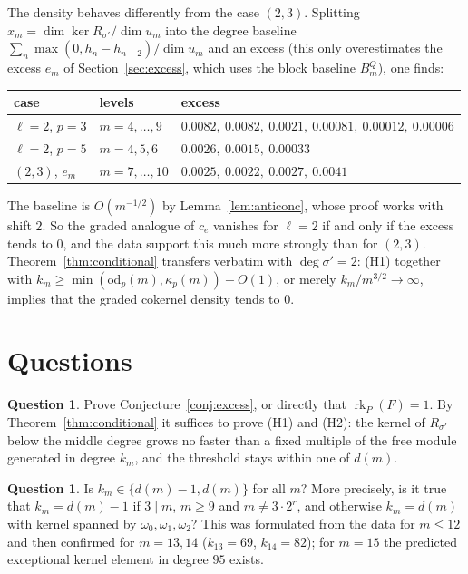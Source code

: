 \documentclass[11pt]{amsart}
\theoremstyle{definition}
\newtheorem{question}[theorem]{Question}
\newcommand{\rk}{\operatorname{rk}}
\begin{document}
The density behaves differently from the case $(2,3)$. Splitting $x_m=\dim\ker R_{\sigma'}/\dim u_m$ into the degree
baseline $\sum_n\max(0,h_n-h_{n+2})/\dim u_m$ and an excess (this only overestimates the excess $e_m$ of
Section~\ref{sec:excess}, which uses the block baseline $B^Q_m$), one finds:
\begin{center}
\begin{tabular}{lll}
\toprule
case & levels & excess\\
\midrule
$\ell=2$, $p=3$ & $m=4,\dots,9$ & $0.0082,\ 0.0082,\ 0.0021,\ 0.00081,\ 0.00012,\ 0.00006$\\
$\ell=2$, $p=5$ & $m=4,5,6$ & $0.0026,\ 0.0015,\ 0.00033$\\
$(2,3)$, $e_m$ & $m=7,\dots,10$ & $0.0025,\ 0.0022,\ 0.0027,\ 0.0041$\\
\bottomrule
\end{tabular}
\end{center}
The baseline is $O(m^{-1/2})$ by Lemma~\ref{lem:anticonc}, whose proof works with shift $2$. So the graded analogue of
$c_e$ vanishes for $\ell=2$ if and only if the excess tends to $0$, and the data support this much more strongly than
for $(2,3)$. Theorem~\ref{thm:conditional} transfers verbatim with $\deg\sigma'=2$: (H1) together with
$k_m\ge\min(\mathrm{od}_p(m),\kappa_p(m))-O(1)$, or merely $k_m/m^{3/2}\to\infty$, implies that the graded cokernel
density tends to $0$.

\section{Questions}

\begin{question}
Prove Conjecture~\ref{conj:excess}, or directly that $\rk_P(F)=1$. By Theorem~\ref{thm:conditional} it suffices to prove
(H1) and (H2): the kernel of $R_{\sigma'}$ below the middle degree grows no faster than a fixed multiple of the
free module generated in degree $k_m$, and the threshold stays within one of $d(m)$.
\end{question}

\begin{question}
Is $k_m\in\{d(m)-1,d(m)\}$ for all $m$? More precisely, is it true that $k_m=d(m)-1$ if $3\mid m$, $m\ge9$ and
$m\ne3\cdot2^r$, and otherwise $k_m=d(m)$ with kernel spanned by $\omega_0,\omega_1,\omega_2$? This was formulated from
the data for $m\le12$ and then confirmed for $m=13,14$ ($k_{13}=69$, $k_{14}=82$); for $m=15$ the predicted exceptional
kernel element in degree $95$ exists.
\end{question}
\end{document}
